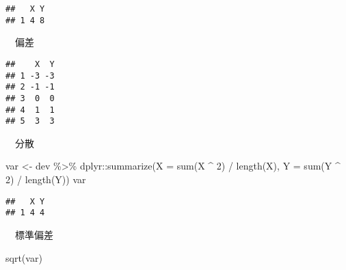 \documentclass[
  12pt,
]{book}
\newenvironment{Shaded}{\begin{snugshade}}{\end{snugshade}}
\newcommand{\AttributeTok}[1]{\textcolor[rgb]{0.77,0.63,0.00}{#1}}
\newcommand{\DecValTok}[1]{\textcolor[rgb]{0.00,0.00,0.81}{#1}}
\newcommand{\FunctionTok}[1]{\textcolor[rgb]{0.00,0.00,0.00}{#1}}
\newcommand{\NormalTok}[1]{#1}
\newcommand{\OtherTok}[1]{\textcolor[rgb]{0.56,0.35,0.01}{#1}}
\newcommand{\SpecialCharTok}[1]{\textcolor[rgb]{0.00,0.00,0.00}{#1}}
\begin{document}
\begin{verbatim}
##   X Y
## 1 4 8
\end{verbatim}

　偏差

\begin{Shaded}
\end{Shaded}

\begin{verbatim}
##    X  Y
## 1 -3 -3
## 2 -1 -1
## 3  0  0
## 4  1  1
## 5  3  3
\end{verbatim}

　分散

\begin{Shaded}
\begin{Highlighting}[]
\NormalTok{var }\OtherTok{\textless{}{-}}\NormalTok{ dev }\SpecialCharTok{\%\textgreater{}\%} 
\NormalTok{  dplyr}\SpecialCharTok{::}\FunctionTok{summarize}\NormalTok{(}\AttributeTok{X =} \FunctionTok{sum}\NormalTok{(X }\SpecialCharTok{\^{}} \DecValTok{2}\NormalTok{) }\SpecialCharTok{/} \FunctionTok{length}\NormalTok{(X), }\AttributeTok{Y =} \FunctionTok{sum}\NormalTok{(Y }\SpecialCharTok{\^{}} \DecValTok{2}\NormalTok{) }\SpecialCharTok{/} \FunctionTok{length}\NormalTok{(Y))}
\NormalTok{var}
\end{Highlighting}
\end{Shaded}

\begin{verbatim}
##   X Y
## 1 4 4
\end{verbatim}

　標準偏差

\begin{Shaded}
\begin{Highlighting}[]
\FunctionTok{sqrt}\NormalTok{(var)}
\end{Highlighting}
\end{Shaded}
\end{document}
